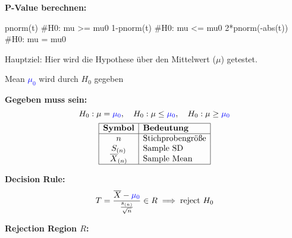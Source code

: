 \textbf{P-Value berechnen:}
\begin{rcode}{1}
pnorm(t) #H0: mu >= mu0
1-pnorm(t) #H0: mu <= mu0
2*pnorm(-abs(t)) #H0: mu = mu0
\end{rcode}

\columnbreak

\begin{center}
\end{center}
\normalsize
Hauptziel: Hier wird die Hypothese über den Mittelwert ($\mu$) getestet.
\begin{center}

\textcolor{red}{\warning} Mean \textcolor{blue}{$\mu_0$} wird durch $H_0$ gegeben \textcolor{red}{\warning}
\end{center}
\large{\textbf{Gegeben muss sein:}}
\[
H_0: \mu = \textcolor{blue}{\mu_0}, \quad H_0: \mu \leq \textcolor{blue}{\mu_0}, \quad H_0: \mu \geq \textcolor{blue}{\mu_0}
\]
\[
\begin{array}{|c|l|}
\hline
\textbf{Symbol} & \textbf{Bedeutung} \\
\hline
n & \text{Stichprobengröße} \\
S_{(n)} & \text{Sample SD} \\
\overline{X}_{(n)} & \text{Sample Mean} \\
\hline
\end{array}
\]

\begin{comment}
\large{\textbf{Teststatistik:}}

\[
T = \frac{\overline{X}_{(n)} - \textcolor{blue}{\mu}}{\frac{s_{(n)}}{\sqrt{n}}} \sim t_{n-1},\text{with }
s^2_{(n)} = \frac{1}{n-1} \sum_{i=1}^n (X_i - \overline{X}_{(n)})^2
\]
\end{comment}
\large{\textbf{Decision Rule:}}
\[
T = \frac{\overline{X} - \textcolor{blue}{\mu_0}}{\frac{s_{(n)}}{\sqrt{n}}} \in R \implies \text{reject } H_0
\]

\large{\textbf{Rejection Region \(R\):}}

